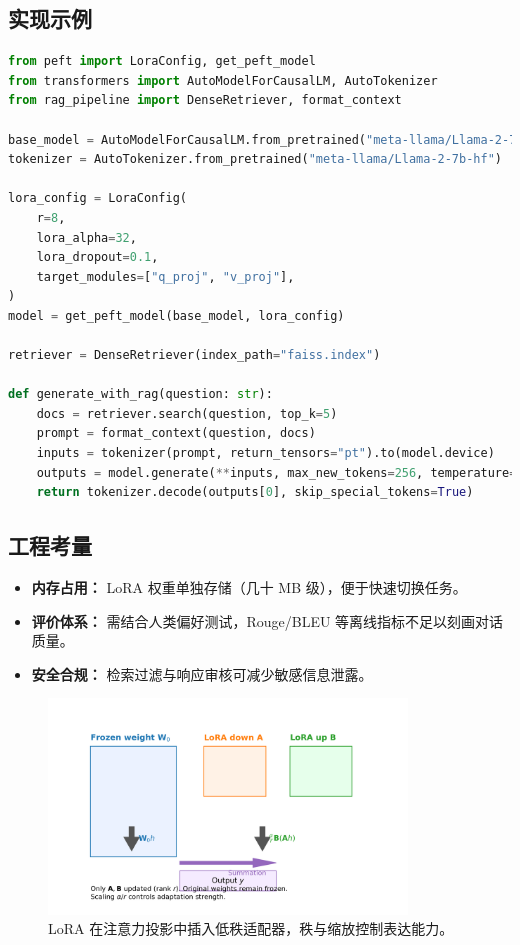 \documentclass[UTF8,zihao=-4]{ctexart}
\begin{document}
\subsection{实现示例}
\begin{lstlisting}[language=Python, caption={基于 Hugging Face PEFT 的 LoRA + RAG 组合示例。}]
from peft import LoraConfig, get_peft_model
from transformers import AutoModelForCausalLM, AutoTokenizer
from rag_pipeline import DenseRetriever, format_context

base_model = AutoModelForCausalLM.from_pretrained("meta-llama/Llama-2-7b-hf", device_map="auto")
tokenizer = AutoTokenizer.from_pretrained("meta-llama/Llama-2-7b-hf")

lora_config = LoraConfig(
    r=8,
    lora_alpha=32,
    lora_dropout=0.1,
    target_modules=["q_proj", "v_proj"],
)
model = get_peft_model(base_model, lora_config)

retriever = DenseRetriever(index_path="faiss.index")

def generate_with_rag(question: str):
    docs = retriever.search(question, top_k=5)
    prompt = format_context(question, docs)
    inputs = tokenizer(prompt, return_tensors="pt").to(model.device)
    outputs = model.generate(**inputs, max_new_tokens=256, temperature=0.7)
    return tokenizer.decode(outputs[0], skip_special_tokens=True)
\end{lstlisting}

\subsection{工程考量}
\begin{itemize}
  \item \textbf{内存占用：} LoRA 权重单独存储（几十 MB 级），便于快速切换任务。
  \item \textbf{评价体系：} 需结合人类偏好测试，Rouge/BLEU 等离线指标不足以刻画对话质量。
  \item \textbf{安全合规：} 检索过滤与响应审核可减少敏感信息泄露。
\end{itemize}

\begin{figure}[H]
  \centering
  \includegraphics[width=0.85\textwidth]{lora_rank_update.png}
  \caption{LoRA 在注意力投影中插入低秩适配器，秩与缩放控制表达能力。}
  \label{fig:lora_rank_update_cn}
\end{figure}
\end{document}
